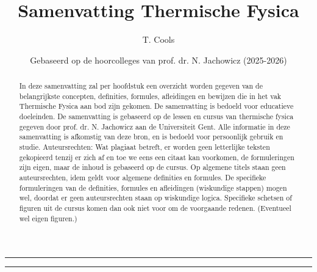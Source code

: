 \documentclass[a4paper,twoside]{article}
\title{Samenvatting Thermische Fysica}
\author{T. Cools}
\date{Gebaseerd op de hoorcolleges van prof. dr. N. Jachowicz (2025-2026)}
\theoremstyle{definition}
\begin{document}
\maketitle
\hrule
\begin{abstract}
    In deze samenvatting zal per hoofdstuk een overzicht worden gegeven van de belangrijkste concepten, definities, formules, afleidingen en bewijzen die in het vak Thermische Fysica aan bod zijn gekomen.
    De samenvatting is bedoeld voor educatieve doeleinden.
    De samenvatting is gebaseerd op de lessen en cursus van thermische fysica gegeven door prof. dr. N. Jachowicz aan de Universiteit Gent. Alle informatie in deze samenvatting is afkomstig van deze bron, en is bedoeld voor persoonlijk gebruik en studie.
    \medskip
    Auteursrechten:
    \medskip
    Wat plagiaat betreft, er worden geen letterlijke teksten gekopieerd tenzij er zich af en toe we eens een citaat kan voorkomen, de formuleringen zijn eigen, maar de inhoud is gebaseerd op de cursus. Op algemene titels staan geen auteursrechten, idem geldt voor algemene definities en formules.
    De specifieke formuleringen van de definities, formules en afleidingen (wiskundige stappen) mogen wel, doordat er geen auteursrechten staan op wiskundige logica. Specifieke schetsen of figuren uit de cursus komen dan ook niet voor om de voorgaande redenen. (Eventueel wel eigen figuren.)
\end{abstract}
\hrule










\end{document}
